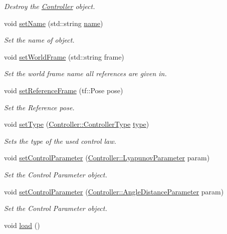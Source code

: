 \begin{DoxyCompactItemize}
\begin{DoxyCompactList}\small\item\em Destroy the \hyperlink{classController}{Controller} object. \end{DoxyCompactList}\item 
void \hyperlink{classController_a177d0d6cd7cdb7784ae9c506debfa2c6}{set\+Name} (std\+::string \hyperlink{classController_af81f22d8b64d915769acfb8e8d89e0c8}{name})
\begin{DoxyCompactList}\small\item\em Set the name of object. \end{DoxyCompactList}\item 
void \hyperlink{classController_adf25339eadd9b31bc1d6b3e47395942e}{set\+World\+Frame} (std\+::string frame)
\begin{DoxyCompactList}\small\item\em Set the world frame name all references are given in. \end{DoxyCompactList}\item 
void \hyperlink{classController_a4126517e3218037342ce613180d3f16e}{set\+Reference\+Frame} (tf\+::\+Pose pose)
\begin{DoxyCompactList}\small\item\em Set the Reference pose. \end{DoxyCompactList}\item 
void \hyperlink{classController_a25202c469ad65696761242dce4e28d76}{set\+Type} (\hyperlink{classController_aa6d956c4c220461a4152415ffa78690a}{Controller\+::\+Controller\+Type} \hyperlink{classController_a17792cff397dc69baca568c7d03f2fc8}{type})
\begin{DoxyCompactList}\small\item\em Sets the type of the used control law. \end{DoxyCompactList}\item 
void \hyperlink{classController_afa3d88792852e78dd0c68c0cafc0c736}{set\+Control\+Parameter} (\hyperlink{structController_1_1LyapunovParameter}{Controller\+::\+Lyapunov\+Parameter} param)
\begin{DoxyCompactList}\small\item\em Set the Control Parameter object. \end{DoxyCompactList}\item 
void \hyperlink{classController_ae214988d47b9ca5999b6a689139a4cec}{set\+Control\+Parameter} (\hyperlink{structController_1_1AngleDistanceParameter}{Controller\+::\+Angle\+Distance\+Parameter} param)
\begin{DoxyCompactList}\small\item\em Set the Control Parameter object. \end{DoxyCompactList}\item 
void \hyperlink{classController_a55c77d2e41634c9b21543647f74eec4c}{load} ()\hypertarget{classController_a55c77d2e41634c9b21543647f74eec4c}{}\label{classController_a55c77d2e41634c9b21543647f74eec4c}


\end{DoxyCompactItemize}
